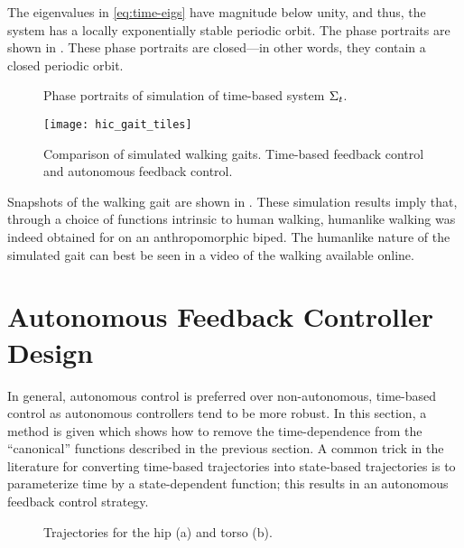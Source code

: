 The eigenvalues in \eqref{eq:time-eigs} have magnitude below unity, and thus,
the system has a locally exponentially stable periodic orbit.
%
The phase portraits are shown in .
%
These phase portraits are closed---in other words, they contain a closed
periodic orbit.
%
\begin{figure*}[t!]
  \centering
  \caption{Phase portraits of simulation of time-based system $\Sigma_t$.}
  \label{fig:pp-t}
\end{figure*}
%
\begin{figure}[t!]
  \centering
  \texttt{[image: hic\_gait\_tiles]}
  \caption[Comparison of simulated walking gaits.]{Comparison of simulated
    walking gaits. Time-based feedback control and autonomous feedback
    control.}
  \label{fig:gaittiles}
\end{figure}
%
Snapshots of the walking gait are shown in .
%
These simulation results imply that, through a choice of functions intrinsic to
human walking, humanlike walking was indeed obtained for on an anthropomorphic
biped.
%
The humanlike nature of the simulated gait can best be seen in a video of the
walking available online.

\section{Autonomous Feedback Controller Design}

In general, autonomous control is preferred over non-autonomous, time-based
control as autonomous controllers tend to be more robust.
%
In this section, a method is given which shows how to remove the time-dependence
from the ``canonical'' functions described in the previous section.
%
A common trick in the literature \cite{Westervelt2007} for converting time-based
trajectories into state-based trajectories is to parameterize time by a
state-dependent function;
%
this results in an autonomous feedback control strategy.

\begin{figure}[t]
  \centering
  \caption{Trajectories for the hip (a) and torso (b).}
  \label{fig:torso-hip}
\end{figure}



